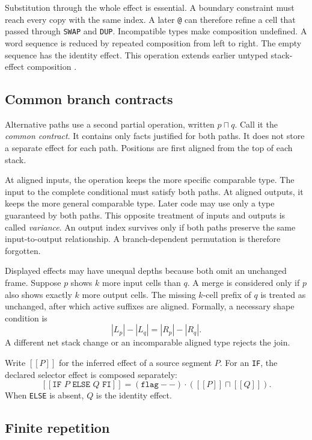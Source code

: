 \documentclass[11pt,a4paper]{article}
\newcommand{\meet}{\mathbin{\sqcap}}
\newcommand{\seq}{\mathbin{\cdot}}
\newcommand{\sem}[1]{[\![#1]\!]}
\begin{document}
Substitution through the whole effect is essential.  A boundary constraint
must reach every copy with the same index.  A later \texttt{@} can therefore
refine a cell that passed through \texttt{SWAP} and \texttt{DUP}.
Incompatible types make composition undefined.  A word sequence is reduced by
repeated composition from left to right.  The empty sequence has the identity
effect.  This operation extends earlier untyped stack-effect composition
\cite{poial1994}.

\subsection{Common branch contracts}
\label{sec:branch-op}

Alternative paths use a second partial operation, written $p\meet q$.  Call it
the \emph{common contract}.  It contains only facts justified for both paths.
It does not store a separate effect for each path.  Positions are first aligned
from the top of each stack.

At aligned inputs, the operation keeps the more specific comparable type.  The
input to the complete conditional must satisfy both paths.  At aligned outputs,
it keeps the more general comparable type.  Later code may use only a type
guaranteed by both paths.  This opposite treatment of inputs and outputs is
called \emph{variance}.  An output index survives only if both paths preserve
the same input-to-output relationship.  A branch-dependent permutation is
therefore forgotten.

Displayed effects may have unequal depths because both omit an unchanged frame.
Suppose $p$ shows $k$ more input cells than $q$.  A merge is considered only if
$p$ also shows exactly $k$ more output cells.  The missing $k$-cell prefix of
$q$ is treated as unchanged, after which active suffixes are aligned.  Formally,
a necessary shape condition is
\[
 |L_p|-|L_q| = |R_p|-|R_q|.
\]
A different net stack change or an incomparable aligned type rejects the join.

Write $\sem{P}$ for the inferred effect of a source segment $P$.  For an
\texttt{IF}, the declared selector effect is composed separately:
\[
 \sem{\texttt{IF }P\texttt{ ELSE }Q\texttt{ FI}}
   = (\texttt{flag}--)\seq
     (\sem{P}\meet\sem{Q}).
\]
When \texttt{ELSE} is absent, $Q$ is the identity effect.

\subsection{Finite repetition}
\label{sec:repeat-op}
\end{document}

